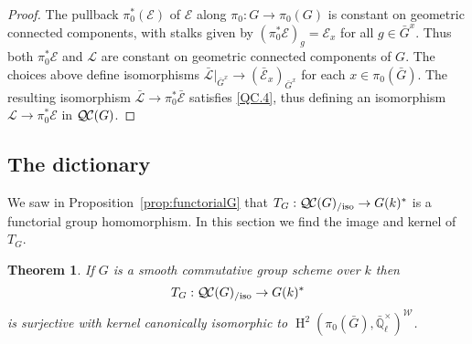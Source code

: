 \documentclass[CM,Submssn,SecEq]{degruyter-crelle} %
\theoremstyle{plain}
\newtheorem{theorem}{Theorem}[section]
\theoremstyle{definition}
\theoremstyle{remark}
\newcommand{\EE}{\mathbb{\bar Q}_\ell}
\newcommand{\Fq}{k}
\newcommand{\EEx}{\EE^\times}
\newcommand{\Weil}[1]{\mathcal{W}_{#1}}
\DeclareMathOperator{\Hh}{H}
\newcommand{\TrFrob}[1]{T_{#1}}
\newcommand{\qcs}[1]{{\mathcal{#1}}}
\newcommand{\gqcs}[1]{{\mathcal{\bar #1}}}
\newcommand{\QC}{{\mathcal{Q\hskip-0.8pt C}}}
\newcommand{\QCiso}[1]{\QC(#1)_{/\text{iso}}}
\newcommand{\bG}{\bar{G}}
\begin{document}
\begin{proof}
The pullback $\pi_0^*(\qcs{E})$ of $\qcs{E}$ along $\pi_0 : G \to \pi_0(G)$ is constant
on geometric connected components, with stalks given by
$(\pi_0^* \qcs{E})_g = \qcs{E}_{x}$ for all $g\in \bG^x$.  Thus both $\pi_0^*\qcs{E}$ and $\qcs{L}$
are constant on geometric connected components of $G$.
The choices above define isomorphisms
$\gqcs{L}\vert_{\bG^x} \to  (\gqcs{E}_{x})_{\bG^x}$ for each $x\in \pi_0(\bG)$.
The resulting isomorphism $\gqcs{L} \to \pi_0^* \gqcs{E}$ satisfies \ref{QC.4},
thus defining an isomorphism $\qcs{L} \to \pi_0^* \qcs{E}$ in $\QC(G)$.
\end{proof}

\subsection{The dictionary}
\label{ssec:snake}

We saw in Proposition~\ref{prop:functorialG} that $\TrFrob{G} : \QCiso{G} \to G(\Fq)^*$ is a functorial group homomorphism.
In this section we find the image and kernel of $\TrFrob{G}$.

\begin{theorem}\label{thm:snake}
  If $G$ is a smooth commutative group scheme over $\Fq$ then
  \[
  \TrFrob{G} : \QCiso{G} \to G(\Fq)^*
  \]
is surjective with kernel canonically isomorphic to $\Hh^2(\pi_0({\bar G}),\EEx)^{\Weil{}}$.
\end{theorem}
\end{document}
